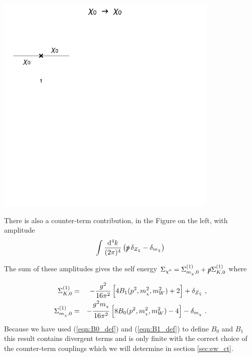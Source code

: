 \documentclass[11pt]{article}
\newcommand{\mychi}{\raisebox{0pt}[1ex][1ex]{\tiny$\chi$}}
\def\cn{\chi^0}
\renewcommand{\d}{\ensuremath{\operatorname{d}\!}}
\def\mc{m_{\mychi}}
\begin{document}
\vspace{0.5cm}

\noindent\begin{minipage}{0.3\textwidth}
\includegraphics[width=0.8\textwidth]{1loop_1c.pdf}
\end{minipage}
\noindent\begin{minipage}{0.7\textwidth}
There is also a counter-term contribution, in the Figure on the left, with amplitude
\begin{align}
 \int \frac{\d^4k}{(2\pi)^4}\left(\slashed{p}\,\delta_{Z_{\tilde{\chi}}}-\delta_{m_{\tilde{\chi}}}\right)
 \end{align}
 \end{minipage}
\vspace{0.3cm}

The sum of these amplitudes gives the self energy $\Sigma_{\cn}= \Sigma_{\mc, 0}^{(1)}+\slashed{p}\Sigma_{K, 0}^{(1)}$ where
\begin{eqnarray}
\Sigma_{K, 0}^{(1)} &=&
-\frac{g^2}{16\pi^2}
\left[ 4 B_1(p^2, \mc^2, m_W^2) + 2 \right]
+\delta_{Z_{\tilde{\chi}}}\ , \label{eq: Neu_K} \\
\Sigma_{\mc, 0}^{(1)} &=&
-\frac{g^2 \mc}{16\pi^2}
\left[ 8 B_0(p^2, \mc^2, m_W^2) - 4 \right]
-\delta_{\mc}\ . \label{eq: Neu_M}
\end{eqnarray}
Because we have used (\ref{eqn:B0_def}) and (\ref{eqn:B1_def}) to define $B_0$ and $B_1$ this result contains divergent terms and is only finite with the correct choice of the counter-term couplings which we will determine in section \ref{sec:ew_ct}.
\end{document}

